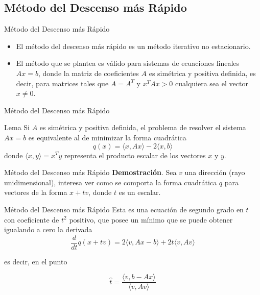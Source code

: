 \documentclass[10pt]{beamer}
\begin{document}
\subsection{M\'etodo del Descenso m\'as R\'apido}
\begin{frame}{M\'etodo del Descenso m\'as R\'apido}
\begin{itemize}
  \item<1-> El m\'etodo del descenso m\'as r\'apido es un m\'etodo iterativo no estacionario.
  \item<2-> El m\'etodo que se plantea es v\'alido para sistemas de ecuaciones lineales $Ax=b$, donde la matriz de coeficientes $A$ es
  sim\'etrica y positiva definida, es decir, para matrices tales que $A=A^T$ y $x^TAx>0$ cualquiera sea el vector $x \neq 0$.
\end{itemize}
\end{frame}
\begin{frame}{M\'etodo del Descenso m\'as R\'apido}
  \begin{block}{Lema}
    Si $A$ es sim\'etrica y positiva definida, el problema de resolver el sistema $Ax=b$ es equivalente al de minimizar la forma cuadr\'atica
$$
q(x) = \langle x,Ax\rangle - 2\langle x,b \rangle
$$
donde $\langle x,y\rangle = x^Ty$ representa el producto escalar de los vectores $x$ y $y$.
  \end{block}
\end{frame}
\begin{frame}{M\'etodo del Descenso m\'as R\'apido}
  \textbf{Demostraci\'on}. Sea $v$ una direcci\'on (rayo unidimensional), interesa ver como se comporta la forma cuadr\'atica $q$ para
vectores de la forma $x+tv$, donde $t$ es un escalar.

\end{frame}
\begin{frame}{M\'etodo del Descenso m\'as R\'apido}
  Esta es una ecuaci\'on de segundo grado en $t$ con coeficiente de $t^2$ positivo, que posee un m\'inimo que se puede obtener igualando a cero la derivada
  $$
  \frac{d}{dt}q(x+tv) = 2\langle v,Ax-b\rangle + 2t\langle v,Av\rangle
  $$

  es decir, en el punto

  $$
  \hat t = \frac{\langle v,b-Ax\rangle}{\langle v,Av\rangle}
  $$
\end{frame}
\end{document}
